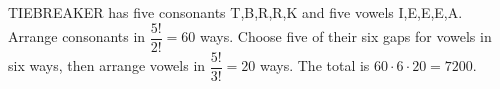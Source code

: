 TIEBREAKER has five consonants T,B,R,R,K and five vowels I,E,E,E,A. Arrange consonants in $\dfrac{5!}{2!}=60$ ways. Choose five of their six gaps for vowels in six ways, then arrange vowels in $\dfrac{5!}{3!}=20$ ways. The total is $60\cdot6\cdot20=\boxed{7200}$.
